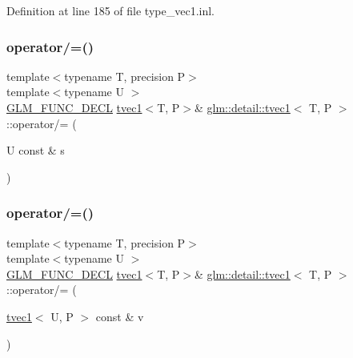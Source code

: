 Definition at line 185 of file type\+\_\+vec1.\+inl.

\mbox{\label{structglm_1_1detail_1_1tvec1_aad8c386f7278e9a5685ada9a1a0ef7df}} 
\subsubsection{\texorpdfstring{operator/=()}{operator/=()}\hspace{0.1cm}{\footnotesize\ttfamily [1/4]}}
{\footnotesize\ttfamily template$<$typename T, precision P$>$ \\
template$<$typename U $>$ \\
\hyperlink{setup_8hpp_ab2d052de21a70539923e9bcbf6e83a51}{G\+L\+M\+\_\+\+F\+U\+N\+C\+\_\+\+D\+E\+CL} \hyperlink{structglm_1_1detail_1_1tvec1}{tvec1}$<$T, P$>$\& \hyperlink{structglm_1_1detail_1_1tvec1}{glm\+::detail\+::tvec1}$<$ T, P $>$\+::operator/= (\begin{DoxyParamCaption}\item[{U const \&}]{s }\end{DoxyParamCaption})}

\mbox{\label{structglm_1_1detail_1_1tvec1_ae74bb46e4d3fd5fdccb1ee6744cbf493}} 
\subsubsection{\texorpdfstring{operator/=()}{operator/=()}\hspace{0.1cm}{\footnotesize\ttfamily [2/4]}}
{\footnotesize\ttfamily template$<$typename T, precision P$>$ \\
template$<$typename U $>$ \\
\hyperlink{setup_8hpp_ab2d052de21a70539923e9bcbf6e83a51}{G\+L\+M\+\_\+\+F\+U\+N\+C\+\_\+\+D\+E\+CL} \hyperlink{structglm_1_1detail_1_1tvec1}{tvec1}$<$T, P$>$\& \hyperlink{structglm_1_1detail_1_1tvec1}{glm\+::detail\+::tvec1}$<$ T, P $>$\+::operator/= (\begin{DoxyParamCaption}\item[{\hyperlink{structglm_1_1detail_1_1tvec1}{tvec1}$<$ U, P $>$ const \&}]{v }\end{DoxyParamCaption})}


